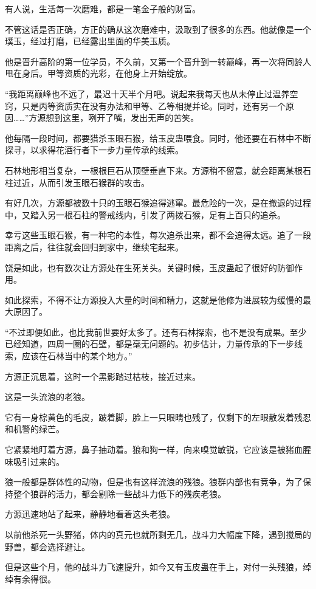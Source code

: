 \begin{this_body}
有人说，生活每一次磨难，都是一笔金子般的财富。

不管这话是否正确，方正的确从这次磨难中，汲取到了很多的东西。他就像是一个璞玉，经过打磨，已经露出里面的华美玉质。

他是晋升高阶的第一位学员，不久前，又第一个晋升到一转巅峰，再一次将同龄人甩在身后。甲等资质的光彩，在他身上开始绽放。

“我距离巅峰也不远了，最迟十天半个月吧。说起来我每天也从未停止过温养空窍，只是丙等资质实在没有办法和甲等、乙等相提并论。同时，还有另一个原因……”方源想到这里，咧开了嘴，发出无声的苦笑。

他每隔一段时间，都要猎杀玉眼石猴，给玉皮蛊喂食。同时，他还要在石林中不断探寻，以求得花酒行者下一步力量传承的线索。

石林地形相当复杂，一根根巨石从顶壁垂直下来。方源稍不留意，就会距离某根石柱过近，从而引发玉眼石猴群的攻击。

有好几次，方源都被数十只的玉眼石猴追得逃窜。最危险的一次，是在撤退的过程中，又踏入另一根石柱的警戒线内，引发了两拨石猴，足有上百只的追杀。

幸亏这些玉眼石猴，有一种宅的本性，每次追杀出来，都不会追得太远。追了一段距离之后，往往就会回归到家中，继续宅起来。

饶是如此，也有数次让方源处在生死关头。关键时候，玉皮蛊起了很好的防御作用。

如此探索，不得不让方源投入大量的时间和精力，这就是他修为进展较为缓慢的最大原因了。

“不过即便如此，也比我前世要好太多了。还有石林探索，也不是没有成果。至少已经知道，四周一圈的石壁，都是毫无问题的。初步估计，力量传承的下一步线索，应该在石林当中的某个地方。”

方源正沉思着，这时一个黑影踏过枯枝，接近过来。

这是一头流浪的老狼。

它有一身棕黄色的毛皮，跛着脚，脸上一只眼睛也残了，仅剩下的左眼散发着残忍和机警的绿芒。

它紧紧地盯着方源，鼻子抽动着。狼和狗一样，向来嗅觉敏锐，它应该是被猪血腥味吸引过来的。

狼一般都是群体性的动物，但是也有这样流浪的残狼。狼群内部也有竞争，为了保持整个狼群的活力，都会剔除一些战斗力低下的残疾老狼。

方源迅速地站了起来，静静地看着这头老狼。

以前他杀死一头野猪，体内的真元也就所剩无几，战斗力大幅度下降，遇到搅局的野兽，都会选择避让。

但是这些个月，他的战斗力飞速提升，如今又有玉皮蛊在手上，对付一头残狼，绰绰有余得很。


\end{this_body}
